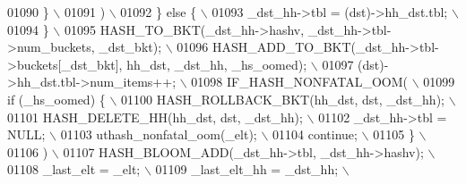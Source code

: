 \begin{DoxyCode}
{{{{{{{{{01090 \textcolor{preprocessor}{              \}                                                                  \(\backslash\)}
01091 \textcolor{preprocessor}{            )                                                                    \(\backslash\)}
01092 \textcolor{preprocessor}{          \} else \{                                                               \(\backslash\)}
01093 \textcolor{preprocessor}{            \_dst\_hh->tbl = (dst)->hh\_dst.tbl;                                    \(\backslash\)}
01094 \textcolor{preprocessor}{          \}                                                                      \(\backslash\)}
01095 \textcolor{preprocessor}{          HASH\_TO\_BKT(\_dst\_hh->hashv, \_dst\_hh->tbl->num\_buckets, \_dst\_bkt);      \(\backslash\)}
01096 \textcolor{preprocessor}{          HASH\_ADD\_TO\_BKT(\_dst\_hh->tbl->buckets[\_dst\_bkt], hh\_dst, \_dst\_hh, \_hs\_oomed); \(\backslash\)}
01097 \textcolor{preprocessor}{          (dst)->hh\_dst.tbl->num\_items++;                                        \(\backslash\)}
01098 \textcolor{preprocessor}{          IF\_HASH\_NONFATAL\_OOM(                                                  \(\backslash\)}
01099 \textcolor{preprocessor}{            if (\_hs\_oomed) \{                                                     \(\backslash\)}
01100 \textcolor{preprocessor}{              HASH\_ROLLBACK\_BKT(hh\_dst, dst, \_dst\_hh);                           \(\backslash\)}
01101 \textcolor{preprocessor}{              HASH\_DELETE\_HH(hh\_dst, dst, \_dst\_hh);                              \(\backslash\)}
01102 \textcolor{preprocessor}{              \_dst\_hh->tbl = NULL;                                               \(\backslash\)}
01103 \textcolor{preprocessor}{              uthash\_nonfatal\_oom(\_elt);                                         \(\backslash\)}
01104 \textcolor{preprocessor}{              continue;                                                          \(\backslash\)}
01105 \textcolor{preprocessor}{            \}                                                                    \(\backslash\)}
01106 \textcolor{preprocessor}{          )                                                                      \(\backslash\)}
01107 \textcolor{preprocessor}{          HASH\_BLOOM\_ADD(\_dst\_hh->tbl, \_dst\_hh->hashv);                          \(\backslash\)}
01108 \textcolor{preprocessor}{          \_last\_elt = \_elt;                                                      \(\backslash\)}
01109 \textcolor{preprocessor}{          \_last\_elt\_hh = \_dst\_hh;                                                \(\backslash\)}
}}}}}}}}}
\end{DoxyCode}
